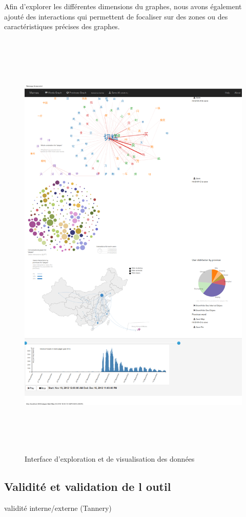 Afin d{\textquoteright}explorer les différentes dimensions du graphes,
nous avons également ajouté des interactions qui permettent de
focaliser sur des zones ou des caractéristiques précises des
graphes. \citep{Bostock2011}

\begin{figure}
    \centering
    \includegraphics[width=6.7213in,height=8.3894in]{figures/chap3/chapitre3-img21.png}
    \caption{Interface d'exploration et de visualisation des données}
\end{figure}


\subsection[Validité et validation de l outil]{Validité et validation de l outil}

validité interne/externe (Tannery)
